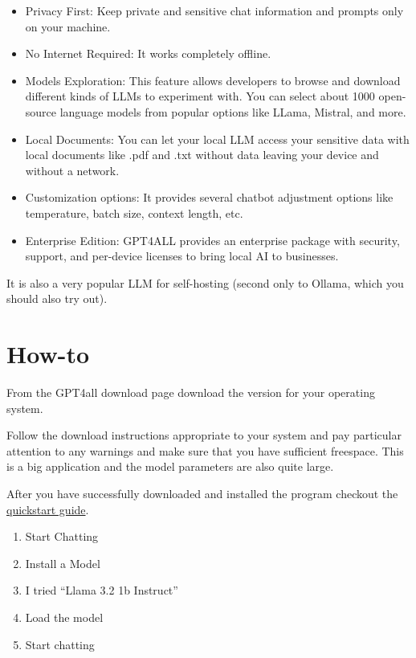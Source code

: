 \documentclass[
  letterpaper,
  DIV=11,
  numbers=noendperiod]{scrreprt}
\providecommand{\tightlist}{%
  \setlength{\itemsep}{0pt}\setlength{\parskip}{0pt}}\usepackage{longtable,booktabs,array}
\begin{document}
\begin{itemize}
\item
  Privacy First: Keep private and sensitive chat information and prompts
  only on your machine.
\item
  No Internet Required: It works completely offline.
\item
  Models Exploration: This feature allows developers to browse and
  download different kinds of LLMs to experiment with. You can select
  about 1000 open-source language models from popular options like
  LLama, Mistral, and more.
\item
  Local Documents: You can let your local LLM access your sensitive data
  with local documents like .pdf and .txt without data leaving your
  device and without a network.
\item
  Customization options: It provides several chatbot adjustment options
  like temperature, batch size, context length, etc.
\item
  Enterprise Edition: GPT4ALL provides an enterprise package with
  security, support, and per-device licenses to bring local AI to
  businesses.
\end{itemize}

It is also a very popular LLM for self-hosting (second only to Ollama,
which you should also try out).

\section{How-to}\label{how-to-1}

From the GPT4all download page download the version for your operating
system.

Follow the download instructions appropriate to your system and pay
particular attention to any warnings and make sure that you have
sufficient freespace. This is a big application and the model parameters
are also quite large.

After you have successfully downloaded and installed the program
checkout the
\href{https://docs.gpt4all.io/gpt4all_desktop/quickstart.html}{quickstart
guide}.

\begin{enumerate}
\def\labelenumi{\arabic{enumi}.}
\tightlist
\item
  Start Chatting
\item
  Install a Model
\item
  I tried ``Llama 3.2 1b Instruct''
\item
  Load the model
\item
  Start chatting
\end{enumerate}
\end{document}
